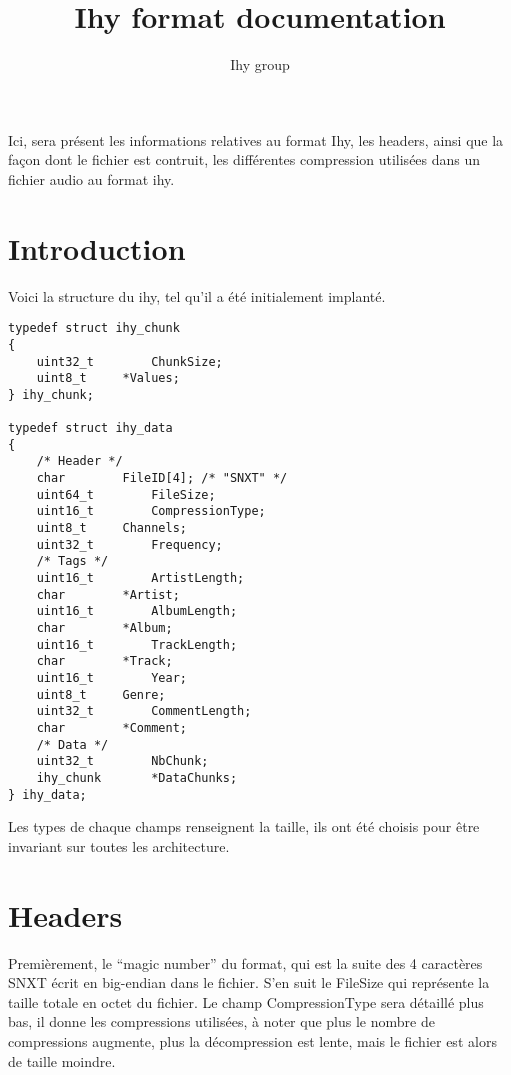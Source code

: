 \documentclass[a4paper,12pt]{article}
\title{Ihy format documentation}
\author{Ihy group}
\begin{document}
\maketitle

\abstract
Ici, sera présent les informations relatives au format Ihy, les headers, ainsi
que la façon dont le fichier est contruit, les différentes compression
utilisées dans un fichier audio au format ihy.

\tableofcontents

\section{Introduction}

Voici la structure du ihy, tel qu'il a été initialement implanté.

\lstset{numbers=left}
\begin{lstlisting}[frame=single]
typedef struct ihy_chunk
{
    uint32_t		ChunkSize;
    uint8_t		*Values;
} ihy_chunk;

typedef struct ihy_data
{
    /* Header */
    char		FileID[4]; /* "SNXT" */
    uint64_t		FileSize;
    uint16_t		CompressionType;
    uint8_t		Channels;
    uint32_t		Frequency;
    /* Tags */
    uint16_t		ArtistLength;
    char		*Artist;
    uint16_t		AlbumLength;
    char		*Album;
    uint16_t		TrackLength;
    char		*Track;
    uint16_t		Year;
    uint8_t		Genre;
    uint32_t		CommentLength;
    char		*Comment;
    /* Data */
    uint32_t		NbChunk;
    ihy_chunk		*DataChunks;
} ihy_data;
\end{lstlisting}

Les types de chaque champs renseignent la taille, ils ont été choisis pour être
invariant sur toutes les architecture.

\section{Headers}

Premièrement, le ``magic number'' du format, qui est la suite des 4 caractères
SNXT écrit en big-endian dans le fichier.
S'en suit le FileSize qui représente la taille totale en octet du fichier.
Le champ CompressionType sera détaillé plus bas, il donne les compressions
utilisées, à noter que plus le nombre de compressions augmente, plus la
décompression est lente, mais le fichier est alors de taille moindre.
\end{document}
